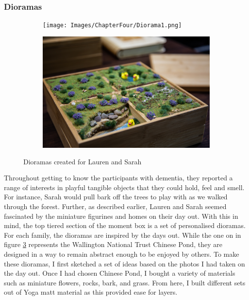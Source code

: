\subsubsection{Dioramas}
\label{Dioramas}

\begin{figure}[htp]
\centering
\begin{subfigure}{.5\textwidth}
  \centering
  \texttt{[image: Images/ChapterFour/Diorama1.png]}
  \label{fig:DiroamaOne}
\end{subfigure}%
\begin{subfigure}{.5\textwidth}
  \centering
  \includegraphics[width=.8\linewidth]{Images/ChapterFour/Diroama2.png}
  \label{fig:DiroamaTwo}
\end{subfigure}
\caption{Dioramas created for Lauren and Sarah}
\label{fig:Dioramas}
\end{figure}

Throughout getting to know the participants with dementia, they reported a range of interests in playful tangible objects that they could hold, feel and smell. For instance, Sarah would pull bark off the trees to play with as we walked through the forest. Further, as described earlier, Lauren and Sarah seemed fascinated by the miniature figurines and homes on their day out. With this in mind, the top tiered section of the moment box is a set of personalised dioramas. For each family, the dioramas are inspired by the days out. While the one on in figure \ref{fig:Dioramas} represents the Wallington National Trust Chinese Pond, they are designed in a way to remain abstract enough to be enjoyed by others. To make these dioramas, I first sketched a set of ideas based on the photos I had taken on the day out. Once I had chosen Chinese Pond, I bought a variety of materials such as miniature flowers, rocks, bark, and grass. From here, I built different sets out of Yoga matt material as this provided ease for layers.

